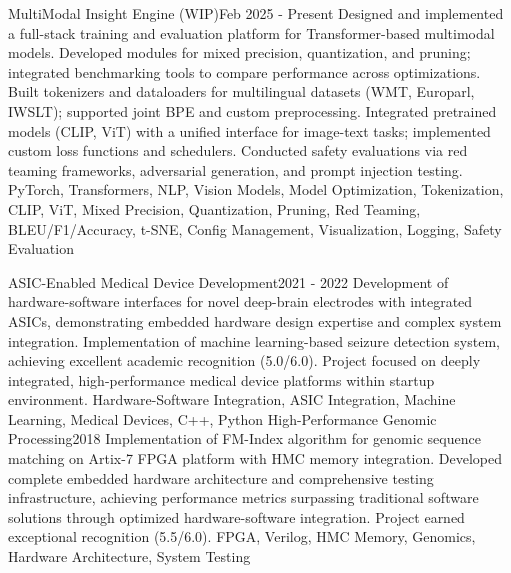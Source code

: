 %
%
%


\begin{projects}

\project
{MultiModal Insight Engine (WIP)}{Feb 2025 - Present}
{}
{Designed and implemented a full-stack training and evaluation platform for Transformer-based multimodal models.
Developed modules for mixed precision, quantization, and pruning; integrated benchmarking tools to compare performance across optimizations.
Built tokenizers and dataloaders for multilingual datasets (WMT, Europarl, IWSLT); supported joint BPE and custom preprocessing.
Integrated pretrained models (CLIP, ViT) with a unified interface for image-text tasks; implemented custom loss functions and schedulers.
Conducted safety evaluations via red teaming frameworks, adversarial generation, and prompt injection testing.}
{PyTorch, Transformers, NLP, Vision Models, Model Optimization, Tokenization, CLIP, ViT, Mixed Precision, Quantization, Pruning, Red Teaming, BLEU/F1/Accuracy, t-SNE, Config Management, Visualization, Logging, Safety Evaluation}


\project
{ASIC-Enabled Medical Device Development}{2021 - 2022}
{}
{Development of hardware-software interfaces for novel deep-brain electrodes with integrated ASICs, demonstrating embedded hardware design expertise and complex system integration. Implementation of machine learning-based seizure detection system, achieving excellent academic recognition (5.0/6.0). Project focused on deeply integrated, high-performance medical device platforms within startup environment.}
{Hardware-Software Integration, ASIC Integration, Machine Learning, Medical Devices, C++, Python}
\newpage
\project
{High-Performance Genomic Processing}{2018}
{}
{Implementation of FM-Index algorithm for genomic sequence matching on Artix-7 FPGA platform with HMC memory integration. Developed complete embedded hardware architecture and comprehensive testing infrastructure, achieving performance metrics surpassing traditional software solutions through optimized hardware-software integration. Project earned exceptional recognition (5.5/6.0).}
{FPGA, Verilog, HMC Memory, Genomics, Hardware Architecture, System Testing}

\end{projects}